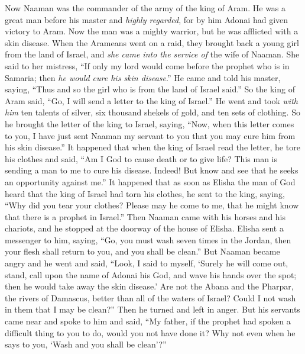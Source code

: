 \begin{biblechapter} %
 Now Naaman was the commander of the army of the king of Aram. He was a great man before his master and \textit{highly regarded}, for by him Adonai had given victory to Aram. Now the man was a mighty warrior, but he was afflicted with a skin disease.
\verse When the Arameans went on a raid, they brought back a young girl from the land of Israel, and \textit{she came into the service of} the wife of Naaman.
\verse She said to her mistress, “If only my lord would come before the prophet who is in Samaria; then \textit{he would cure his skin disease}.”
\verse He came and told his master, saying, “Thus and so the girl who is from the land of Israel said.”
\verse So the king of Aram said, “Go, I will send a letter to the king of Israel.” He went and took \textit{with him} ten talents of silver, six thousand shekels of gold, and ten sets of clothing.
\verse So he brought the letter of the king to Israel, saying, “Now, when this letter comes to you, I have just sent Naaman my servant to you that you may cure him from his skin disease.”
\verse It happened that when the king of Israel read the letter, he tore his clothes and said, “Am I God to cause death or to give life? This man is sending a man to me to cure his disease. Indeed! But know and see that he seeks an opportunity against me.”
\verse It happened that as soon as Elisha the man of God heard that the king of Israel had torn his clothes, he sent to the king, saying, “Why did you tear your clothes? Please may he come to me, that he might know that there is a prophet in Israel.”
\verse Then Naaman came with his horses and his chariots, and he stopped at the doorway of the house of Elisha.
\verse Elisha sent a messenger to him, saying, “Go, you must wash seven times in the Jordan, then your flesh shall return to you, and you shall be clean.”
\verse But Naaman became angry and he went and said, “Look, I said to myself, ‘Surely he will come out, stand, call upon the name of Adonai his God, and wave his hands over the spot; then he would take away the skin disease.’
\verse Are not the Abana and the Pharpar, the rivers of Damascus, better than all of the waters of Israel? Could I not wash in them that I may be clean?” Then he turned and left in anger.
\verse But his servants came near and spoke to him and said, “My father, if the prophet had spoken a difficult thing to you to do, would you not have done it? Why not even when he says to you, ‘Wash and you shall be clean’?”

\end{biblechapter}
